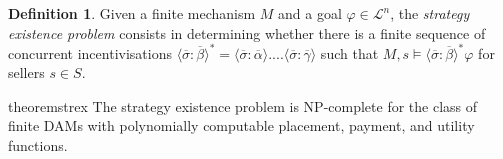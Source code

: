 \documentclass[letterpaper]{article} %
\theoremstyle{definition}
\newtheorem{definition}{Definition}
\newtheorem{theorem}{Theorem}
\newcommand{\munyque}[1]{{[\color{red}#1]}}
\begin{document}
\begin{definition}
    Given a finite mechanism $M$ and a goal $\varphi \in \mathcal{L}^n$, the \emph{strategy existence problem} consists in determining whether there is a finite sequence of concurrent incentivisations $\langle \overline{\sigma}: \overline{\beta} \rangle^\ast = \langle \overline{\sigma}: \overline{\alpha} \rangle .... \langle \overline{\sigma}: \overline{\gamma} \rangle$ such that $M,s \models \langle \overline{\sigma}: \overline{\beta} \rangle^\ast \varphi$ for sellers $s \in S$.   
\end{definition}
\begin{restatable}{theorem}{strex}
\label{thm:strex}
    The strategy existence problem is NP-complete for the class of finite DAMs with polynomially computable placement, payment, and utility functions. %
\end{restatable}
\iffalse
\end{document}
